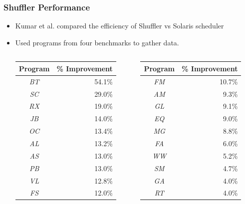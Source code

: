 \documentclass{beamer}
\begin{document}
\begin{frame}
\frametitle{Shuffler Performance}

\begin{itemize}
\item Kumar et al. compared the efficiency of Shuffler vs Solaris scheduler
\item Used programs from four benchmarks to gather data.

\begin{columns}

\begin{column}{0.5\textwidth}
\begin{table}
	\centering
	\begin{tabular}{| c | r |}
	\hline
	\textbf{Program} & \textbf{\% Improvement} \\ \hline
	\emph{BT} & 54.1\% \\ \hline
		\emph{SC} & 29.0\% \\ \hline
		\emph{RX} & 19.0\% \\ \hline
		\emph{JB} & 14.0\% \\ \hline
		\emph{OC} & 13.4\% \\ \hline
		\emph{AL} & 13.2\% \\ \hline
		\emph{AS} & 13.0\% \\ \hline
		\emph{PB} & 13.0\% \\ \hline
		\emph{VL} & 12.8\% \\ \hline
		\emph{FS} & 12.0\% \\ \hline
		
\end{tabular}
\end{table}
\end{column}
\begin{column}{0.5\textwidth}
	\begin{table}
	\centering
	\begin{tabular}{| c | r |}
	\hline
	\textbf{Program} & \textbf{\% Improvement} \\ \hline
		\emph{FM} & 10.7\% \\ \hline
		\emph{AM} & 9.3\% \\ \hline
		\emph{GL} & 9.1\% \\ \hline
		\emph{EQ} & 9.0\% \\ \hline
		\emph{MG} & 8.8\% \\ \hline
		\emph{FA} & 6.0\% \\ \hline
		\emph{WW} & 5.2\% \\ \hline
		\emph{SM} & 4.7\% \\ \hline
		\emph{GA} & 4.0\% \\ \hline
		\emph{RT} & 4.0\% \\ \hline
\end{tabular}
\end{table}
\end{column}
\end{columns}
 
\end{itemize}

\end{frame}
\end{document}
